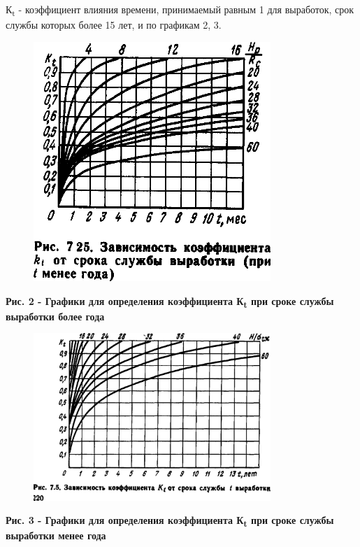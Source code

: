 К\textsubscript{t} - коэффициент влияния времени, принимаемый равным 1
для выработок, срок службы которых более 15 лет, и по графикам 2, 3.

\begin{figure}[H]
	\centering
	\includegraphics[width=0.8\textwidth]{assets/1126}
	\caption*{}
\end{figure}

{\bfseries Рис. 2 - Графики для определения коэффициента К\textsubscript{t}
при сроке службы выработки более года}

\begin{figure}[H]
	\centering
	\includegraphics[width=0.8\textwidth]{assets/1127}
	\caption*{}
\end{figure}

{\bfseries Рис. 3 - Графики для определения коэффициента К\textsubscript{t}
при сроке службы выработки менее года}

